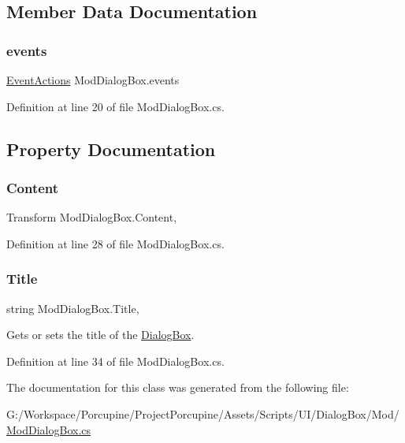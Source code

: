\subsection{Member Data Documentation}
\mbox{\label{class_mod_dialog_box_a3c813d099152381e26ab8c9e69b20ae4}} 
\subsubsection{\texorpdfstring{events}{events}}
{\footnotesize\ttfamily \hyperlink{class_event_actions}{Event\+Actions} Mod\+Dialog\+Box.\+events}



Definition at line 20 of file Mod\+Dialog\+Box.\+cs.



\subsection{Property Documentation}
\mbox{\label{class_mod_dialog_box_a72b137b52209ada16e47f31315d344d0}} 
\subsubsection{\texorpdfstring{Content}{Content}}
{\footnotesize\ttfamily Transform Mod\+Dialog\+Box.\+Content\hspace{0.3cm}{\ttfamily [get]}, {}}



Definition at line 28 of file Mod\+Dialog\+Box.\+cs.

\mbox{\label{class_mod_dialog_box_a5e7896ddc71e02f671cddd75cf65bdc6}} 
\subsubsection{\texorpdfstring{Title}{Title}}
{\footnotesize\ttfamily string Mod\+Dialog\+Box.\+Title\hspace{0.3cm}{\ttfamily [get]}, {}}



Gets or sets the title of the \hyperlink{class_dialog_box}{Dialog\+Box}. 



Definition at line 34 of file Mod\+Dialog\+Box.\+cs.



The documentation for this class was generated from the following file\+:\begin{DoxyCompactItemize}
\item 
G\+:/\+Workspace/\+Porcupine/\+Project\+Porcupine/\+Assets/\+Scripts/\+U\+I/\+Dialog\+Box/\+Mod/\hyperlink{_mod_dialog_box_8cs}{Mod\+Dialog\+Box.\+cs}\end{DoxyCompactItemize}

